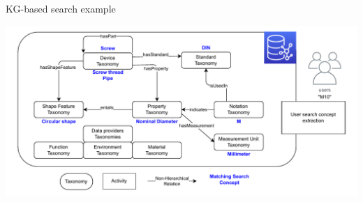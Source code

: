 






\begin{frame}{KG-based search example}

    \vspace{-1em}
    \begin{center}
        \includegraphics[scale=0.55]{images/semantic_search_example-legende.pdf} 
    \end{center}

\end{frame}

